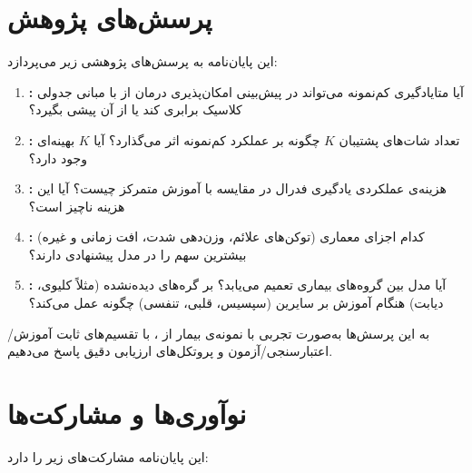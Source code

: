 \section{پرسش‌های پژوهش}

این پایان‌نامه به پرسش‌های پژوهشی زیر می‌پردازد:

\begin{enumerate}
\item \textbf{:} آیا متایادگیری کم‌نمونه می‌تواند در پیش‌بینی امکان‌پذیری درمان از  با مبانی جدولی کلاسیک برابری کند یا از آن پیشی بگیرد؟

\item \textbf{:} تعداد شات‌های پشتیبان $K$ چگونه بر عملکرد کم‌نمونه اثر می‌گذارد؟ آیا $K$ بهینه‌ای وجود دارد؟

\item \textbf{:} هزینه‌ی عملکردی یادگیری فدرال در مقایسه با آموزش متمرکز چیست؟ آیا این هزینه ناچیز است؟

\item \textbf{:} کدام اجزای معماری (توکن‌های علائم، وزن‌دهی شدت، افت زمانی و غیره) بیشترین سهم را در مدل پیشنهادی دارند؟

\item \textbf{:} آیا مدل بین گروه‌های بیماری تعمیم می‌یابد؟ بر گره‌های دیده‌نشده (مثلاً کلیوی، دیابت) هنگام آموزش بر سایرین (سپسیس، قلبی، تنفسی) چگونه عمل می‌کند؟
\end{enumerate}

به این پرسش‌ها به‌صورت تجربی با نمونه‌ی  بیمار از ، با تقسیم‌های ثابت آموزش/اعتبارسنجی/آزمون و پروتکل‌های ارزیابی دقیق پاسخ می‌دهیم.

\section{نوآوری‌ها و مشارکت‌ها}

این پایان‌نامه مشارکت‌های زیر را دارد:

